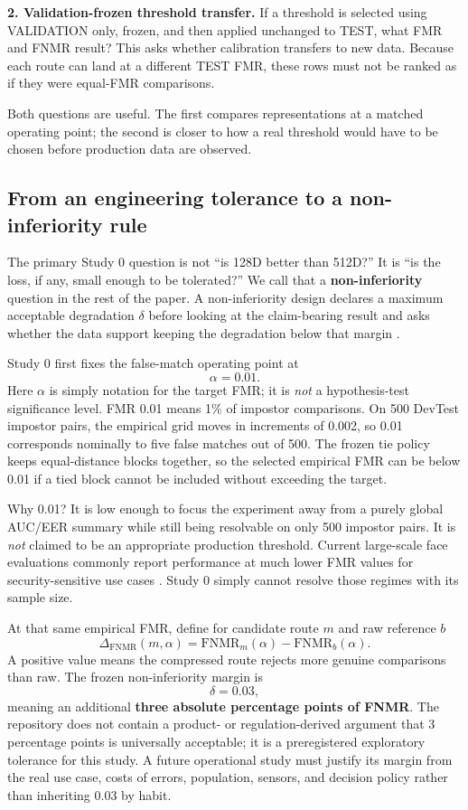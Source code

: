 \documentclass[10pt,a4paper]{article}
\newcommand{\fnmr}{\mathrm{FNMR}}
\newcommand{\DeltaFNMR}{\Delta_{\fnmr}}
\begin{document}
\textbf{2. Validation-frozen threshold transfer.} If a threshold is selected using
VALIDATION only, frozen, and then applied unchanged to TEST, what FMR and FNMR result? This
asks whether calibration transfers to new data. Because each route can land at a different
TEST FMR, these rows must not be ranked as if they were equal-FMR comparisons.

Both questions are useful. The first compares representations at a matched operating point;
the second is closer to how a real threshold would have to be chosen before production data
are observed.

\subsection{From an engineering tolerance to a non-inferiority rule}

The primary Study 0 question is not ``is 128D better than 512D?'' It is ``is the loss, if
any, small enough to be tolerated?'' We call that a \textbf{non-inferiority} question in the
rest of the paper. A non-inferiority design declares a maximum acceptable degradation
$\delta$ before looking at the claim-bearing result and asks whether the data support keeping
the degradation below that margin \cite{wellek2010}.

Study 0 first fixes the false-match operating point at
\[
\alpha=0.01.
\]
Here $\alpha$ is simply notation for the target FMR; it is \emph{not} a hypothesis-test
significance level. FMR 0.01 means 1\% of impostor comparisons. On 500 DevTest impostor
pairs, the empirical grid moves in increments of 0.002, so 0.01 corresponds nominally to
five false matches out of 500. The frozen tie policy keeps equal-distance blocks together,
so the selected empirical FMR can be below 0.01 if a tied block cannot be included without
exceeding the target.

Why 0.01? It is low enough to focus the experiment away from a purely global AUC/EER summary
while still being resolvable on only 500 impostor pairs. It is \emph{not} claimed to be an
appropriate production threshold. Current large-scale face evaluations commonly report
performance at much lower FMR values for security-sensitive use cases \cite{nistfrte11}.
Study 0 simply cannot resolve those regimes with its sample size.

At that same empirical FMR, define for candidate route $m$ and raw reference $b$
\begin{equation}
\DeltaFNMR(m,\alpha)=\fnmr_m(\alpha)-\fnmr_b(\alpha).
\end{equation}
A positive value means the compressed route rejects more genuine comparisons than raw. The
frozen non-inferiority margin is
\[
\delta=0.03,
\]
meaning an additional \textbf{three absolute percentage points of FNMR}. The repository does
not contain a product- or regulation-derived argument that 3 percentage points is universally
acceptable; it is a preregistered exploratory tolerance for this study. A future operational
study must justify its margin from the real use case, costs of errors, population, sensors,
and decision policy rather than inheriting 0.03 by habit.
\end{document}
